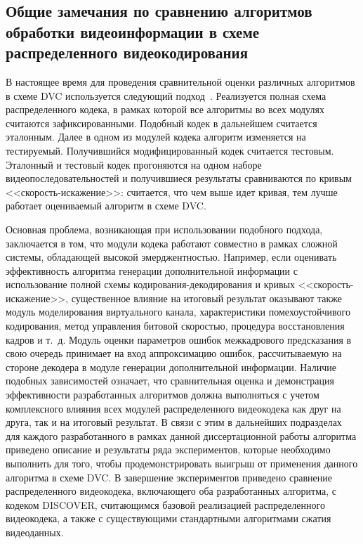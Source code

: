 \subsection{Общие замечания по сравнению алгоритмов обработки видеоинформации в схеме распределенного видеокодирования}
\label{chap:ExpResults:SchemeofExperiment:General}

В настоящее время для проведения сравнительной оценки различных алгоритмов в схеме DVC используется следующий подход~\cite{Huang2008}. Реализуется полная схема распределенного кодека, в рамках которой все алгоритмы во всех модулях считаются зафиксированными. Подобный кодек в дальнейшем считается эталонным. Далее в одном из модулей кодека алгоритм изменяется на тестируемый. Получившийся модифицированный кодек считается тестовым. Эталонный и тестовый кодек прогоняются на одном наборе видеопоследовательностей и получившиеся результаты сравниваются по кривым <<скорость-искажение>>: считается, что чем выше идет кривая, тем лучше работает оцениваемый алгоритм в схеме DVC.

Основная проблема, возникающая при использовании подобного подхода, заключается в том, что модули кодека работают совместно в рамках сложной системы, обладающей высокой эмерджентностью. Например, если оценивать эффективность алгоритма генерации дополнительной информации с использование полной схемы кодирования-декодирования и кривых <<скорость-искажение>>, существенное влияние на итоговый результат оказывают также модуль моделирования виртуального канала, характеристики помехоустойчивого кодирования, метод управления битовой скоростью, процедура восстановления кадров и т.~д. Модуль оценки параметров ошибок межкадрового предсказания в свою очередь принимает на вход аппроксимацию ошибок, рассчитываемую на стороне декодера в модуле генерации дополнительной информации. Наличие подобных зависимостей означает, что сравнительная оценка и демонстрация эффективности разработанных алгоритмов должна выполняться с учетом комплексного влияния всех модулей распределенного видеокодека как друг на друга, так и на итоговый результат. В связи с этим в дальнейших подразделах для каждого разработанного в рамках данной диссертационной работы алгоритма приведено описание и результаты ряда экспериментов, которые необходимо выполнить для того, чтобы продемонстрировать выигрыш от применения данного алгоритма в схеме DVC. В завершение экспериментов приведено сравнение распределенного видеокодека, включающего оба разработанных алгоритма, с кодеком DISCOVER, считающимся базовой реализацией распределенного видеокодека, а также с существующими стандартными алгоритмами сжатия видеоданных.

